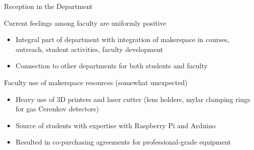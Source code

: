 \documentclass[xcolor={dvipsnames},professionalfonts]{beamer}
\begin{document}
\begin{frame}{Reception in the Department}
 \begin{block}{Current feelings among faculty are uniformly positive}
  \begin{itemize}
   \item Integral part of department with integration of makerspace in courses, outreach, student activities, faculty development
   \item Connection to other departments for both students and faculty
  \end{itemize}
 \end{block}
 \begin{block}{Faculty use of makerspace resources (somewhat unexpected)}
  \begin{itemize}
   \item Heavy use of 3D printers and laser cutter (lens holders, mylar clamping rings for gas Cerenkov detectors)
   \item Source of students with expertise with Raspberry Pi and Arduino
   \item Resulted in co-purchasing agreements for professional-grade equipment
  \end{itemize}
 \end{block}
\end{frame}

\end{document}

